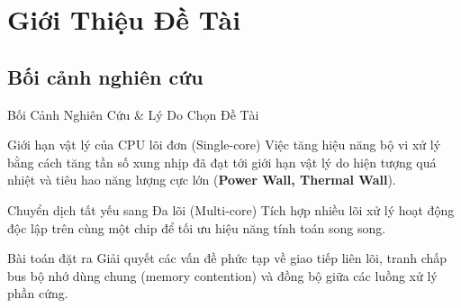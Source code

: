 \section{Giới Thiệu Đề Tài}

\subsection{Bối cảnh nghiên cứu}
\begin{frame}{Bối Cảnh Nghiên Cứu \& Lý Do Chọn Đề Tài}
    \begin{block}{Giới hạn vật lý của CPU lõi đơn (Single-core)}
        \small
        Việc tăng hiệu năng bộ vi xử lý bằng cách tăng tần số xung nhịp đã đạt tới giới hạn vật lý do hiện tượng quá nhiệt và tiêu hao năng lượng cực lớn (\textbf{Power Wall, Thermal Wall}).
    \end{block}
    
    \vspace{0.15cm}
    
    \begin{block}{Chuyển dịch tất yếu sang Đa lõi (Multi-core)}
        \small
        Tích hợp nhiều lõi xử lý hoạt động độc lập trên cùng một chip để tối ưu hiệu năng tính toán song song.
    \end{block}

    \vspace{0.15cm}

    \begin{alertblock}{Bài toán đặt ra}
        \small
        Giải quyết các vấn đề phức tạp về giao tiếp liên lõi, tranh chấp bus bộ nhớ dùng chung (memory contention) và đồng bộ giữa các luồng xử lý phần cứng.
    \end{alertblock}
\end{frame}

